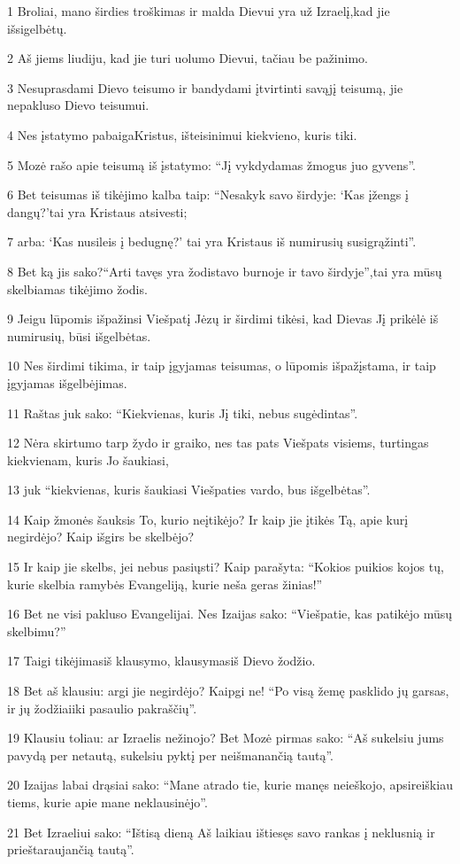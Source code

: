 \par 1 Broliai, mano širdies troškimas ir malda Dievui yra už Izraelį,­kad jie išsigelbėtų. 
\par 2 Aš jiems liudiju, kad jie turi uolumo Dievui, tačiau be pažinimo. 
\par 3 Nesuprasdami Dievo teisumo ir bandydami įtvirtinti savąjį teisumą, jie nepakluso Dievo teisumui. 
\par 4 Nes įstatymo pabaiga­Kristus, išteisinimui kiekvieno, kuris tiki. 
\par 5 Mozė rašo apie teisumą iš įstatymo: “Jį vykdydamas žmogus juo gyvens”. 
\par 6 Bet teisumas iš tikėjimo kalba taip: “Nesakyk savo širdyje: ‘Kas įžengs į dangų?’­tai yra Kristaus atsivesti; 
\par 7 arba: ‘Kas nusileis į bedugnę?’­ tai yra Kristaus iš numirusių susigrąžinti”. 
\par 8 Bet ką jis sako?­“Arti tavęs yra žodis­tavo burnoje ir tavo širdyje”,­tai yra mūsų skelbiamas tikėjimo žodis. 
\par 9 Jeigu lūpomis išpažinsi Viešpatį Jėzų ir širdimi tikėsi, kad Dievas Jį prikėlė iš numirusių, būsi išgelbėtas. 
\par 10 Nes širdimi tikima, ir taip įgyjamas teisumas, o lūpomis išpažįstama, ir taip įgyjamas išgelbėjimas. 
\par 11 Raštas juk sako: “Kiekvienas, kuris Jį tiki, nebus sugėdintas”. 
\par 12 Nėra skirtumo tarp žydo ir graiko, nes tas pats Viešpats visiems, turtingas kiekvienam, kuris Jo šaukiasi, 
\par 13 juk “kiekvienas, kuris šaukiasi Viešpaties vardo, bus išgelbėtas”. 
\par 14 Kaip žmonės šauksis To, kurio neįtikėjo? Ir kaip jie įtikės Tą, apie kurį negirdėjo? Kaip išgirs be skelbėjo? 
\par 15 Ir kaip jie skelbs, jei nebus pasiųsti? Kaip parašyta: “Kokios puikios kojos tų, kurie skelbia ramybės Evangeliją, kurie neša geras žinias!” 
\par 16 Bet ne visi pakluso Evangelijai. Nes Izaijas sako: “Viešpatie, kas patikėjo mūsų skelbimu?” 
\par 17 Taigi tikėjimas­iš klausymo, klausymas­iš Dievo žodžio. 
\par 18 Bet aš klausiu: argi jie negirdėjo? Kaipgi ne! “Po visą žemę pasklido jų garsas, ir jų žodžiai­iki pasaulio pakraščių”. 
\par 19 Klausiu toliau: ar Izraelis nežinojo? Bet Mozė pirmas sako: “Aš sukelsiu jums pavydą per netautą, sukelsiu pyktį per neišmanančią tautą”. 
\par 20 Izaijas labai drąsiai sako: “Mane atrado tie, kurie manęs neieškojo, apsireiškiau tiems, kurie apie mane neklausinėjo”. 
\par 21 Bet Izraeliui sako: “Ištisą dieną Aš laikiau ištiesęs savo rankas į neklusnią ir prieštaraujančią tautą”.


